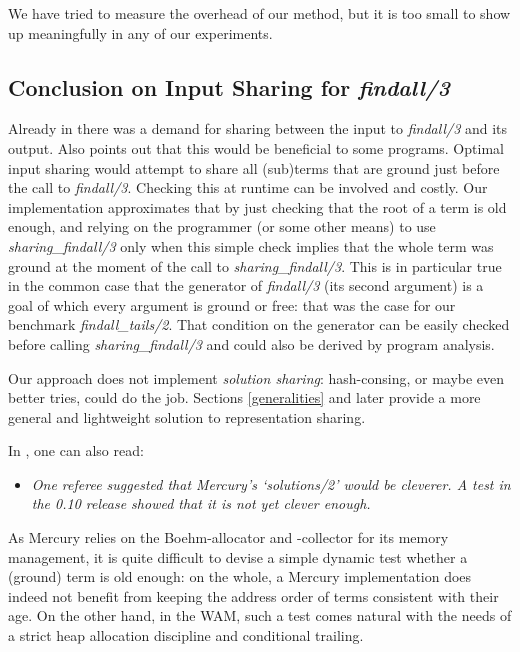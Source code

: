 \documentclass{tlp}
\begin{document}
We have tried to measure the overhead of our method, but it is too
small to show up meaningfully in any of our experiments.


\subsection{Conclusion on Input Sharing for {\em findall/3}}

Already in \cite{findall1archive} there was a demand for sharing
between the input to {\em findall/3} and its output. Also \cite{OKeefePearl}
points out that this would be beneficial to some programs.
Optimal input sharing would attempt to share all (sub)terms that are
ground just before the call to {\em findall/3}. Checking this at
runtime can be involved and costly. Our implementation approximates
that by just checking that the root of a term is old enough,
and relying on the programmer (or some other means) to use {\em
  sharing\_findall/3} only when this simple check implies that the
whole term was ground at the moment of the call to {\em
  sharing\_findall/3}. This is in particular true in the common case
that the generator of {\em findall/3} (its second argument) is a
goal of which every argument is ground or free: that was the case for
our benchmark {\em findall\_tails/2}. That condition on the generator
can be easily checked before calling {\em sharing\_findall/3} and
could also be derived by program analysis.

\begin{sloppypar}
Our approach does not implement {\em solution sharing}: hash-consing,
or maybe even better tries, could do the job. Sections
\ref{generalities} and later provide a more general and lightweight
solution to representation sharing.
\end{sloppypar}


In \cite{OKeefePearl}, one can also read:
\begin{itemize}
\item[]
{\em One referee suggested that Mercury's `solutions/2' would be
cleverer. A test in the 0.10 release showed that it is not yet clever
enough.}
\end{itemize}

As Mercury \cite{zoltan:mercury} relies on the Boehm-allocator and
-collector for its memory management, it is quite difficult to devise
a simple dynamic test whether a (ground) term is old enough: on the
whole, a Mercury implementation does indeed not benefit from keeping
the address order of terms consistent with their age. On the other
hand, in the WAM, such a test comes natural with the needs of a strict
heap allocation discipline and conditional trailing.
\end{document}
